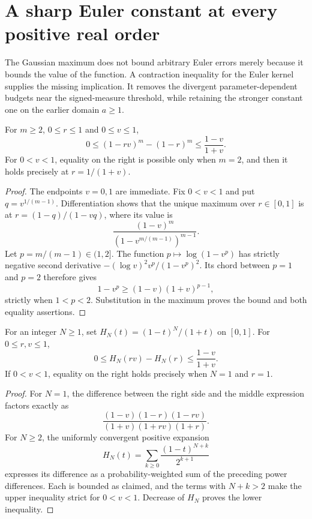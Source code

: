\section{A sharp Euler constant at every positive real order}
\label{univeuler:sec:main}
The Gaussian maximum does not bound arbitrary Euler errors merely because
it bounds the value of the function. A contraction inequality for the
Euler kernel supplies the missing implication. It removes the divergent
parameter-dependent budgets near the signed-measure threshold, while
retaining the stronger constant one on the earlier domain $a\ge1$.

\begin{lemma}\label{univeuler:lem:powers}
For $m\ge2$, $0\le r\le1$ and $0\le v\le1$,
\[
 0\le(1-rv)^m-(1-r)^m\le\frac{1-v}{1+v}.
\]
For $0<v<1$, equality on the right is possible only when $m=2$,
and then it holds precisely at $r=1/(1+v)$.
\end{lemma}
\begin{proof}
The endpoints $v=0,1$ are immediate. Fix $0<v<1$ and put
$q=v^{1/(m-1)}$. Differentiation shows that the unique maximum over
$r\in[0,1]$ is at $r=(1-q)/(1-vq)$, where its value is
\[
 \frac{(1-v)^m}{(1-v^{m/(m-1)})^{m-1}}.
\]
Let $p=m/(m-1)\in(1,2]$. The function
$p\mapsto\log(1-v^p)$ has strictly negative second derivative
$-(\log v)^2v^p/(1-v^p)^2$. Its chord between $p=1$ and $p=2$
therefore gives
\[
 1-v^p\ge(1-v)(1+v)^{p-1},
\]
strictly when $1<p<2$. Substitution in the maximum proves the bound
and both equality assertions.
\end{proof}

\begin{lemma}
\label{univeuler:lem:contraction}
For an integer $N\ge1$, set $H_N(t)=(1-t)^N/(1+t)$ on $[0,1]$.
For $0\le r,v\le1$,
\begin{equation}\label{univeuler:eq:contraction}
 0\le H_N(rv)-H_N(r)\le\frac{1-v}{1+v}.
\end{equation}
If $0<v<1$, equality on the right holds precisely when $N=1$ and $r=1$.
\end{lemma}
\begin{proof}
For $N=1$, the difference between the right side and the middle
expression factors exactly as
\[
 \frac{(1-v)(1-r)(1-rv)}{(1+v)(1+rv)(1+r)}.
\]
For $N\ge2$, the uniformly convergent positive expansion
\[
 H_N(t)=\sum_{k\ge0}\frac{(1-t)^{N+k}}{2^{k+1}}
\]
expresses its difference as a probability-weighted sum of the preceding
power differences. Each is bounded as claimed, and the terms with
$N+k>2$ make the upper inequality strict for $0<v<1$. Decrease of
$H_N$ proves the lower inequality.
\end{proof}


